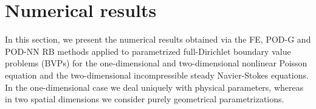 \documentclass{elsarticle}
\numberwithin{equation}{section}
\theoremstyle{theorem}
\theoremstyle{definition}
\theoremstyle{remark}
\theoremstyle{proposition}
\numberwithin{figure}{section}
\begin{document}
			
	
	\section{Numerical results}
	\label{section:Numerical results}
	
		In this section, we present the numerical results obtained via the FE, POD-G and POD-NN RB methods applied to parametrized full-Dirichlet boundary value problems (BVPs) for the one-dimensional and two-dimensional nonlinear Poisson equation and the two-dimensional incompressible steady Navier-Stokes equations. %
		In the one-dimensional case we deal uniquely with physical parameters, whereas in two spatial dimensions we consider purely geometrical parametrizations. %
		
\end{document}
